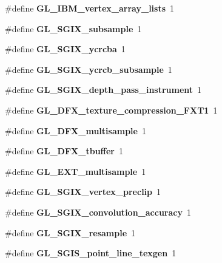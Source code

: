\begin{DoxyCompactItemize}
\item 
\#define {\bfseries G\+L\+\_\+\+I\+B\+M\+\_\+vertex\+\_\+array\+\_\+lists}~1\label{_s_d_l__opengl_8h_ad37efaae7ec42fa0dce5761e0b07a57f}

\item 
\#define {\bfseries G\+L\+\_\+\+S\+G\+I\+X\+\_\+subsample}~1\label{_s_d_l__opengl_8h_aa547dea5ff3e19d06ff0c513d1afb0ab}

\item 
\#define {\bfseries G\+L\+\_\+\+S\+G\+I\+X\+\_\+ycrcba}~1\label{_s_d_l__opengl_8h_a40d3cae64337f92284ab9d6e0b81415b}

\item 
\#define {\bfseries G\+L\+\_\+\+S\+G\+I\+X\+\_\+ycrcb\+\_\+subsample}~1\label{_s_d_l__opengl_8h_a9fcb7a8991877688bbc503ab2cd95038}

\item 
\#define {\bfseries G\+L\+\_\+\+S\+G\+I\+X\+\_\+depth\+\_\+pass\+\_\+instrument}~1\label{_s_d_l__opengl_8h_a99b013fb3f6b98e61514600a1ed53976}

\item 
\#define {\bfseries G\+L\+\_\+D\+F\+X\+\_\+texture\+\_\+compression\+\_\+\+F\+X\+T1}~1\label{_s_d_l__opengl_8h_a932133cb6adacda7d651bb222ed32f26}

\item 
\#define {\bfseries G\+L\+\_\+D\+F\+X\+\_\+multisample}~1\label{_s_d_l__opengl_8h_a917729ea6a0be783ebcb8b097c6c6dd9}

\item 
\#define {\bfseries G\+L\+\_\+D\+F\+X\+\_\+tbuffer}~1\label{_s_d_l__opengl_8h_aaa92a52b93b294b4c34b5f22337a92a0}

\item 
\#define {\bfseries G\+L\+\_\+\+E\+X\+T\+\_\+multisample}~1\label{_s_d_l__opengl_8h_a6550f80ab48388d5a38536976a387408}

\item 
\#define {\bfseries G\+L\+\_\+\+S\+G\+I\+X\+\_\+vertex\+\_\+preclip}~1\label{_s_d_l__opengl_8h_a86b9b582ba913cf87a166081a14a86e4}

\item 
\#define {\bfseries G\+L\+\_\+\+S\+G\+I\+X\+\_\+convolution\+\_\+accuracy}~1\label{_s_d_l__opengl_8h_ac4880640dcf0966bae842894274dfbfb}

\item 
\#define {\bfseries G\+L\+\_\+\+S\+G\+I\+X\+\_\+resample}~1\label{_s_d_l__opengl_8h_afc10e823ceca29a212a4ec3cd7afdcf1}

\item 
\#define {\bfseries G\+L\+\_\+\+S\+G\+I\+S\+\_\+point\+\_\+line\+\_\+texgen}~1\label{_s_d_l__opengl_8h_a1c8b64fd51364fe376de8b8fb7b807f2}


\end{DoxyCompactItemize}
